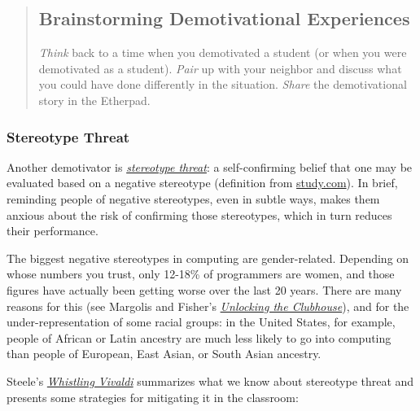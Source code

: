 \begin{quotation}   %
\subsection*{Brainstorming Demotivational Experiences}

\emph{Think} back to a time when you demotivated a student (or when you were demotivated as a student).
\emph{Pair} up with your neighbor and discuss what you could have done differently in the situation.
\emph{Share} the demotivational story in the Etherpad.
\end{quotation}   %

\subsubsection*{Stereotype Threat}

Another demotivator is \emph{\href{https://en.wikipedia.org/wiki/Stereotype\_threat}{stereotype threat}}:
a self-confirming belief that one may be evaluated based on a negative stereotype
(definition from \href{http://study.com/academy/lesson/stereotype-threat-definition-examples-theories.html}{study.com}).
In brief,
reminding people of negative stereotypes,
even in subtle ways,
makes them anxious about the risk of confirming those stereotypes,
which in turn reduces their performance.

The biggest negative stereotypes in computing are gender-related.
Depending on whose numbers you trust,
only 12-18\% of programmers are women,
and those figures have actually been getting worse over the last 20 years.
There are many reasons for this
(see Margolis and Fisher's \emph{\href{http://www.amazon.com/Unlocking-Clubhouse-Computing-Jane-Margolis/dp/0262632691/}{Unlocking the Clubhouse}}),
and for the under-representation of some racial groups:
in the United States,
for example,
people of African or Latin ancestry are much less likely to go into computing
than people of European, East Asian, or South Asian ancestry.

Steele's \emph{\href{http://www.amazon.com/dp/0393339726/}{Whistling Vivaldi}}
summarizes what we know about stereotype threat
and presents some strategies for mitigating it in the classroom:

